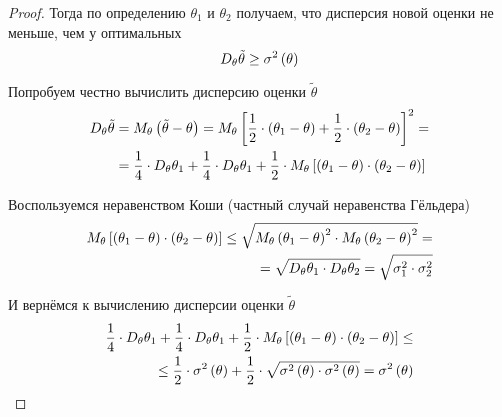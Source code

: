 \begin{proof}
    Тогда по определению $\theta_1$ и $\theta_2$ получаем,
    что дисперсия новой оценки не меньше, чем у оптимальных
    \begin{equation}\label{eq:estimator_ge}
        D_{\theta} \tilde{\theta}\ge\sigma^2\left(\theta\right)
    \end{equation}

    Попробуем честно вычислить дисперсию оценки $\tilde{\theta}$
    \begin{align*}
    D_{\theta} \tilde{\theta}
        &=M_{\theta} \left( \tilde{\theta}-\theta \right)
        =M_{\theta} \left[ \frac{1}{2}\cdot\left( \theta_1-\theta \right)
            +\frac{1}{2}\cdot\left( \theta_2-\theta \right) \right]^2=\\
        &=\frac{1}{4}\cdot D_{\theta} \theta_1
            +\frac{1}{4}\cdot D_{\theta} \theta_1
            +\frac{1}{2}\cdot M_{\theta} \left[ \left( \theta_1-\theta \right)
                    \cdot\left( \theta_2-\theta \right) \right]
    \end{align*}

    Воспользуемся неравенством Коши (частный случай неравенства Гёльдера)
    \begin{eqnarray}\label{eq:koshi_eq}
        M_{\theta} \left[ \left( \theta_1-\theta \right)
            \cdot\left( \theta_2-\theta \right) \right]
        \le\sqrt{M_{\theta} \left( \theta_1-\theta \right)^2
            \cdot M_{\theta} \left( \theta_2-\theta \right)^2}=\\
        =\sqrt{D_{\theta} \theta_1
            \cdot D_{\theta} \theta_2}
        =\sqrt{\sigma_1^2\cdot\sigma_2^2}\nonumber
    \end{eqnarray}
    
    И вернёмся к вычислению дисперсии оценки $\tilde{\theta}$
    \begin{align*}
        \frac{1}{4}\cdot D_{\theta} \theta_1
            +\frac{1}{4}\cdot D_{\theta} \theta_1
            +\frac{1}{2}\cdot M_{\theta} \left[ \left( \theta_1-\theta \right)
                    \cdot\left( \theta_2-\theta \right) \right]\le\\
        \le\frac{1}{2}\cdot\sigma^2\left( \theta \right)
            +\frac{1}{2}\cdot\sqrt{\sigma^2\left( \theta \right)
                \cdot\sigma^2\left( \theta \right)}
        =\sigma^2\left( \theta \right)
    \end{align*}


\end{proof}
